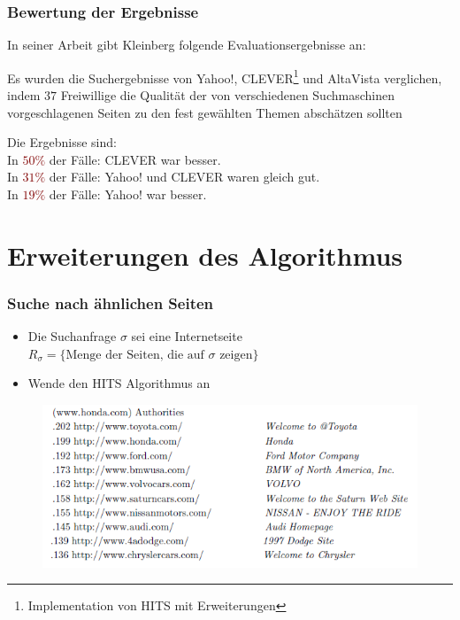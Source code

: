 \documentclass[hyperref={pdfpagelabels=false}]{beamer}
\begin{document}
\begin{frame}
\frametitle{Bewertung der Ergebnisse}

\fontsize{11pt}{7.2}\selectfont
In seiner Arbeit \cite{Kleinberg} gibt Kleinberg folgende Evaluationsergebnisse an:

\vspace{10pt}
Es wurden die Suchergebnisse von Yahoo!, CLEVER\footnote[1]{Implementation von HITS mit Erweiterungen}\cite{CLEVER} und AltaVista\cite{AltaVista} verglichen, indem $37$ Freiwillige die Qualität der von verschiedenen Suchmaschinen vorgeschlagenen Seiten zu den fest gewählten Themen abschätzen sollten

\vspace{10pt}
Die Ergebnisse sind:\\
In \textcolor{maroon}{$50 \%$} der Fälle: CLEVER war besser.\\
In \textcolor{maroon}{$31 \%$} der Fälle: Yahoo! und CLEVER waren gleich gut.\\ 
In \textcolor{maroon}{$19 \%$} der Fälle: Yahoo! war besser.\\ 

\end{frame}

\section{Erweiterungen des Algorithmus}

\begin{frame}
\frametitle{Suche nach ähnlichen Seiten}
\begin{itemize}
\item Die Suchanfrage $\sigma$ sei eine Internetseite\\
	\hspace{5pt} $R_\sigma = \{\text{Menge der Seiten, die auf }\sigma  \text{ zeigen}\}$
\item Wende den HITS Algorithmus an
\end{itemize}

\begin{block}{} \begin{figure}
	\includegraphics[scale=0.6]{honda.png}
\end{figure} \end{block}

\end{frame}
\end{document}

